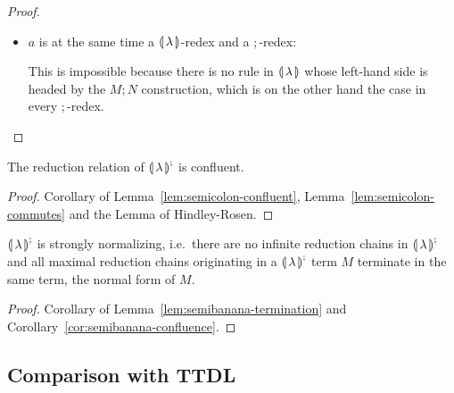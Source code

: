 \begin{proof}
\begin{itemize}
    Let $a = M; N$. We proceed the same way as in case 3 in the proof of
    Lemma~\ref{lem:semicolon-confluent}. We have an outer $;$-reduction and
    an inner denotation-preserving reduction. Performing the inner
    reduction $a \to_\calc b$ first does not change the denotation and so
    we can still apply the $;$-reduction $b \to_; d$. Performing the outer
    reduction $a \to_; c$ first either throws away the redex for the
    $\calc$ reduction and so we have $c = d$, or it preserves it whole and
    then we can still perform the reduction $c \to_\calc d$.

  \item $a$ is at the same time a $\calc$-redex and a $;$-redex:

    This is impossible because there is no rule in $\calc$ whose left-hand
    side is headed by the $M; N$ construction, which is on the other hand
    the case in every $;$-redex.
  \end{itemize}
\end{proof}

\begin{corollary}\label{cor:semibanana-confluence}
  
  The reduction relation of ${\llparenthesis \, \lambda \, \rrparenthesis}^;$ is confluent.
\end{corollary}

\begin{proof}
  Corollary of Lemma~\ref{lem:semicolon-confluent},
  Lemma~\ref{lem:semicolon-commutes} and the Lemma of Hindley-Rosen.
\end{proof}

\begin{theorem}

  ${\llparenthesis \, \lambda \, \rrparenthesis}^;$ is strongly normalizing, i.e.\ there are no infinite reduction
  chains in ${\llparenthesis \, \lambda \, \rrparenthesis}^;$ and all maximal reduction chains originating in a
  ${\llparenthesis \, \lambda \, \rrparenthesis}^;$ term $M$ terminate in the same term, the normal form of $M$.
\end{theorem}

\begin{proof}
  Corollary of Lemma~\ref{lem:semibanana-termination} and
  Corollary~\ref{cor:semibanana-confluence}.
\end{proof}


\subsection{Comparison with TTDL}
\label{ssec:comparison-ttdl}

